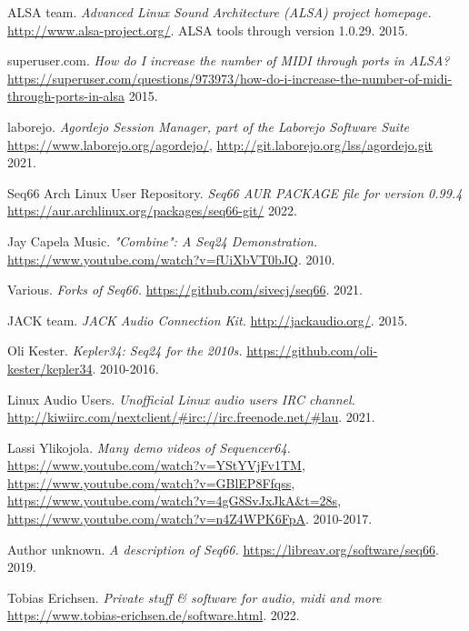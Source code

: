 {\RaggedRight
\begin{thebibliography}{99}

   ALSA team.
   \emph{Advanced Linux Sound Architecture (ALSA) project homepage.}
   \url{http://www.alsa-project.org/}.
   ALSA tools through version 1.0.29.
   2015.

   superuser.com.
   \emph{How do I increase the number of MIDI through ports in ALSA?}
   \url{https://superuser.com/questions/973973/how-do-i-increase-the-number-of-midi-through-ports-in-alsa}
   2015.

   laborejo.
   \emph{Agordejo Session Manager, part of the Laborejo Software Suite}
   \url{https://www.laborejo.org/agordejo/},
   \url{http://git.laborejo.org/lss/agordejo.git}
   2021.

   Seq66 Arch Linux User Repository.
   \emph{Seq66 AUR PACKAGE file for version 0.99.4}
   \url{https://aur.archlinux.org/packages/seq66-git/}
   2022.

   Jay Capela Music.
   \emph{"Combine": A Seq24 Demonstration.}
   \url{https://www.youtube.com/watch?v=fUiXbVT0bJQ}.
   2010.

   Various.
   \emph{Forks of Seq66.}
   \url{https://github.com/sivecj/seq66}.
   2021.

   JACK team.
   \emph{JACK Audio Connection Kit.}
   \url{http://jackaudio.org/}.
   2015.

   Oli Kester.
   \emph{Kepler34: Seq24 for the 2010s.}
   \url{https://github.com/oli-kester/kepler34}.
   2010-2016.

   Linux Audio Users.
   \emph{Unofficial Linux audio users IRC channel.}
   \url{http://kiwiirc.com/nextclient/#irc://irc.freenode.net/#lau}.
   2021.

   Lassi Ylikojola.
   \emph{Many demo videos of Sequencer64.}
   \url{https://www.youtube.com/watch?v=YStYVjFv1TM},
   \url{https://www.youtube.com/watch?v=GBlEP8Ffqss},
   \url{https://www.youtube.com/watch?v=4gG8SvJxJkA&t=28s},
   \url{https://www.youtube.com/watch?v=n4Z4WPK6FpA}.
   2010-2017.

   Author unknown.
   \emph{A description of Seq66.}
   \url{https://libreav.org/software/seq66}.
   2019.

   Tobias Erichsen.
   \emph{Private stuff \& software for audio, midi and more}
   \url{https://www.tobias-erichsen.de/software.html}.
   2022.


\end{thebibliography}}
